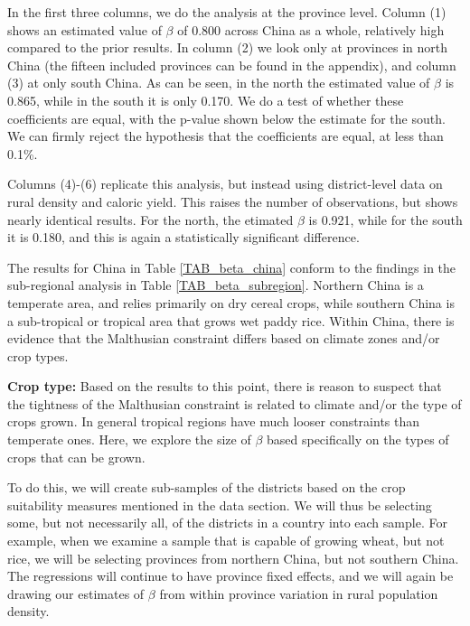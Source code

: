 \documentclass[11pt]{article}
\begin{document}
In the first three columns, we do the analysis at the province level. Column (1) shows an estimated value of $\beta$ of 0.800 across China as a whole, relatively high compared to the prior results. In column (2) we look only at provinces in north China (the fifteen included provinces can be found in the appendix), and column (3) at only south China. As can be seen, in the north the estimated value of $\beta$ is 0.865, while in the south it is only 0.170. We do a test of whether these coefficients are equal, with the p-value shown below the estimate for the south. We can firmly reject the hypothesis that the coefficients are equal, at less than 0.1\%. 

Columns (4)-(6) replicate this analysis, but instead using district-level data on rural density and caloric yield. This raises the number of observations, but shows nearly identical results. For the north, the etimated $\beta$ is 0.921, while for the south it is 0.180, and this is again a statistically significant difference. 

The results for China in Table \ref{TAB_beta_china} conform to the findings in the sub-regional analysis in Table \ref{TAB_beta_subregion}. Northern China is a temperate area, and relies primarily on dry cereal crops, while southern China is a sub-tropical or tropical area that grows wet paddy rice. Within China, there is evidence that the Malthusian constraint differs based on climate zones and/or crop types.

\vspace{.5cm}\noindent\textbf{Crop type:} Based on the results to this point, there is reason to suspect that the tightness of the Malthusian constraint is related to climate and/or the type of crops grown. In general tropical regions have much looser constraints than temperate ones. Here, we explore the size of $\beta$ based specifically on the types of crops that can be grown.

To do this, we will create sub-samples of the districts based on the crop suitability measures mentioned in the data section. We will thus be selecting some, but not necessarily all, of the districts in a country into each sample. For example, when we examine a sample that is capable of growing wheat, but not rice, we will be selecting provinces from northern China, but not southern China. The regressions will continue to have province fixed effects, and we will again be drawing our estimates of $\beta$ from within province variation in rural population density.
\end{document}

